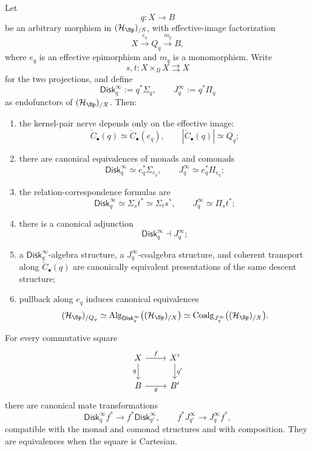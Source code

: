 \begin{theorem}
\label{thm:effective-relation-calculus}
Let
\[
    q:X\longrightarrow B
\]
be an arbitrary morphism in $(\mathcal H_{\Sp})_{/S}$, with effective-image factorization
\[
    X\xrightarrow{e_q}Q_q\xrightarrow{m_q}B,
\]
where $e_q$ is an effective epimorphism and $m_q$ is a monomorphism.  Write
\[
    s,t:X\times_BX\rightrightarrows X
\]
for the two projections, and define
\[
    \mathsf{Disk}^{\infty}_q:=q^*\Sigma_q,
    \qquad
    J^\infty_q:=q^*\Pi_q
\]
as endofunctors of $(\mathcal H_{\Sp})_{/X}$.
Then:
\begin{enumerate}
    \item the kernel-pair nerve depends only on the effective image:
    \[
        \check C_\bullet(q)\simeq\check C_\bullet(e_q),
        \qquad
        \left|\check C_\bullet(q)\right|\simeq Q_q;
    \]
    \item there are canonical equivalences of monads and comonads
    \[
        \mathsf{Disk}^{\infty}_q\simeq e_q^*\Sigma_{e_q},
        \qquad
        J^\infty_q\simeq e_q^*\Pi_{e_q};
    \]
    \item the relation-correspondence formulas are
    \[
        \mathsf{Disk}^{\infty}_q\simeq\Sigma_s t^*
        \simeq\Sigma_t s^*,
        \qquad
        J^\infty_q\simeq\Pi_s t^*;
    \]
    \item there is a canonical adjunction
    \[
        \mathsf{Disk}^{\infty}_q\dashv J^\infty_q;
    \]
    \item a $\mathsf{Disk}^{\infty}_q$-algebra structure, a $J^\infty_q$-coalgebra
    structure, and coherent transport along $\check C_\bullet(q)$ are canonically
    equivalent presentations of the same descent structure;
    \item pullback along $e_q$ induces canonical equivalences
    \[
        (\mathcal H_{\Sp})_{/Q_q}
        \simeq
        \operatorname{Alg}_{\mathsf{Disk}^{\infty}_q}
        \bigl((\mathcal H_{\Sp})_{/X}\bigr)
        \simeq
        \operatorname{Coalg}_{J^\infty_q}
        \bigl((\mathcal H_{\Sp})_{/X}\bigr).
    \]
\end{enumerate}
For every commutative square
\[
\begin{tikzcd}
X \arrow[r,"f"] \arrow[d,"q"'] & X' \arrow[d,"q'"]\\
B \arrow[r,"g"'] & B'
\end{tikzcd}
\]
there are canonical mate transformations
\[
    \mathsf{Disk}^{\infty}_q f^*\longrightarrow f^*\mathsf{Disk}^{\infty}_{q'},
    \qquad
    f^*J^\infty_{q'}\longrightarrow J^\infty_qf^*,
\]
compatible with the monad and comonad structures and with composition.  They
are equivalences when the square is Cartesian.
\end{theorem}

